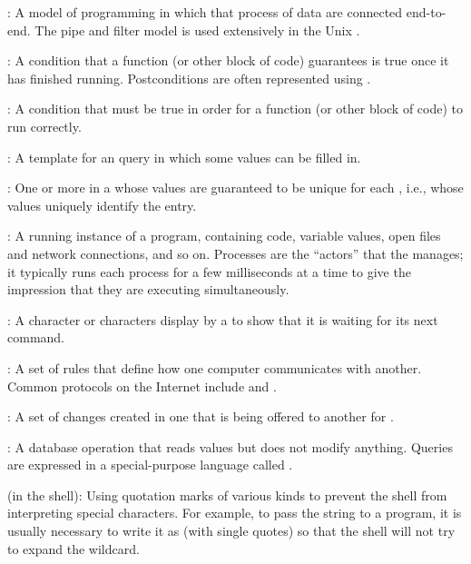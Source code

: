 :
A model of programming in which
 that process 
of data are connected end-to-end. The pipe and filter model is used
extensively in the Unix .

:
A condition that a function (or other block of
code) guarantees is true once it has finished running. Postconditions
are often represented using .

:
A condition that must be true in order for a
function (or other block of code) to run correctly.

:
A template for an 
query in which some values can be filled in.

:
One or more  in
a  whose values are
guaranteed to be unique for each ,
i.e., whose values uniquely identify the entry.

:
A running instance of a program, containing code,
variable values, open files and network connections, and so on.
Processes are the ``actors'' that the
 manages; it typically
runs each process for a few milliseconds at a time to give the
impression that they are executing simultaneously.

:
A character or characters display by a
 to show that it is waiting for its next command.

:
A set of rules that define how one computer communicates with another.
Common protocols on the Internet include  and .
 
:
A set of changes created in one  
that is being offered to another for .

:
A database operation that reads values but does not
modify anything. Queries are expressed in a special-purpose language
called .

 (in the shell):
Using quotation marks of various kinds
to prevent the shell from interpreting special characters. For example,
to pass the string  to a program, it is usually necessary
to write it as  (with single quotes) so that the shell
will not try to expand the \code{*} wildcard.
 
